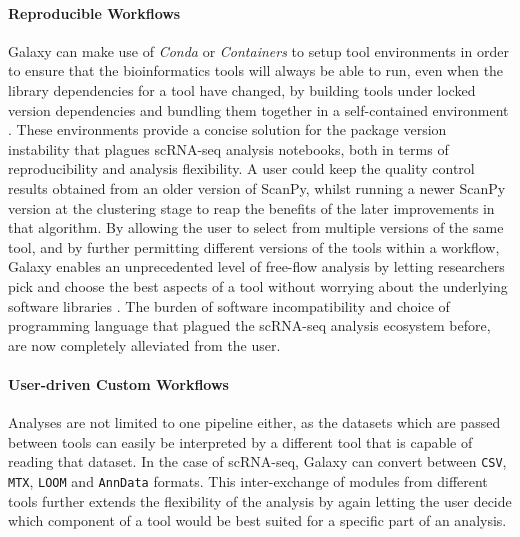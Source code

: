 \documentclass[a4paper,num-refs]{oup-contemporary}
\newcommand{\prog}[1]{\textit{#1}} %
\newcommand{\fileformat}[1]{\texttt{#1}} %
\begin{document}
\paragraph{Reproducible Workflows}
Galaxy can make use of \prog{Conda} or \prog{Containers} to setup tool environments in order to ensure that the bioinformatics tools will always be able to run, even when the library dependencies for a tool have changed, by building tools under locked version dependencies and bundling them together in a self-contained environment \citep{gruning2018practical}. These environments provide a concise solution for the package version instability that plagues scRNA-seq analysis notebooks, both in terms of reproducibility and analysis flexibility. A user could keep the quality control results obtained from an older version of ScanPy, whilst running a newer ScanPy version at the clustering stage to reap the benefits of the later improvements in that algorithm. 
By allowing the user to select from multiple versions of the same tool, and by further permitting different versions of the tools within a workflow, Galaxy enables an unprecedented level of free-flow analysis by letting researchers pick and choose the best aspects of a tool without worrying about the underlying software libraries \citep{gruning2018bioconda}. The burden of software incompatibility and choice of programming language that plagued the scRNA-seq analysis ecosystem before, are now completely alleviated from the user.

\paragraph{User-driven Custom Workflows}
Analyses are not limited to one pipeline either, as the datasets which are passed between tools can easily be interpreted by a different tool that is capable of reading that dataset. In the case of scRNA-seq, Galaxy can convert between \fileformat{CSV}, \fileformat{MTX}, \fileformat{LOOM} and \fileformat{AnnData} formats. This inter-exchange of modules from different tools further extends the flexibility of the analysis by again letting the user decide which component of a tool would be best suited for a specific part of an analysis.
\end{document}
